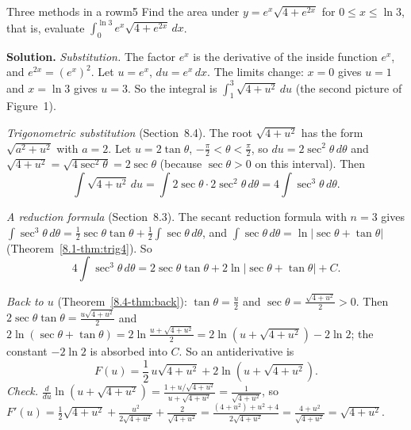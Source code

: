 \documentclass[11pt]{article}
\begin{document}
\begin{exmp}{Three methods in a row}{m5}
Find the area under $y=e^x\sqrt{4+e^{2x}}$ for $0\le x\le\ln3$, that is, evaluate $\displaystyle\int_0^{\ln3}e^x\sqrt{4+e^{2x}}\,dx$.

\textbf{Solution.} \emph{Substitution.} The factor $e^x$ is the derivative of the inside function $e^x$, and $e^{2x}=(e^x)^2$. Let $u=e^x$, $du=e^x\,dx$. The limits change: $x=0$ gives $u=1$ and $x=\ln3$ gives $u=3$. So the integral is $\int_1^3\sqrt{4+u^2}\,du$ (the second picture of Figure~1).

\emph{Trigonometric substitution} (Section~8.4). The root $\sqrt{4+u^2}$ has the form $\sqrt{a^2+u^2}$ with $a=2$. Let $u=2\tan\theta$, $-\frac\pi2<\theta<\frac\pi2$, so $du=2\sec^2\theta\,d\theta$ and $\sqrt{4+u^2}=\sqrt{4\sec^2\theta}=2\sec\theta$ (because $\sec\theta>0$ on this interval). Then
\[\int\sqrt{4+u^2}\,du=\int2\sec\theta\cdot2\sec^2\theta\,d\theta=4\int\sec^3\theta\,d\theta .\]

\emph{A reduction formula} (Section~8.3). The secant reduction formula with $n=3$ gives $\int\sec^3\theta\,d\theta=\frac12\sec\theta\tan\theta+\frac12\int\sec\theta\,d\theta$, and $\int\sec\theta\,d\theta=\ln\lvert\sec\theta+\tan\theta\rvert$ (Theorem~\ref{8.1-thm:trig4}). So
\[4\int\sec^3\theta\,d\theta=2\sec\theta\tan\theta+2\ln\lvert\sec\theta+\tan\theta\rvert+C .\]

\emph{Back to $u$} (Theorem~\ref{8.4-thm:back}): $\tan\theta=\frac u2$ and $\sec\theta=\frac{\sqrt{4+u^2}}2>0$. Then $2\sec\theta\tan\theta=\frac{u\sqrt{4+u^2}}2$ and $2\ln(\sec\theta+\tan\theta)=2\ln\frac{u+\sqrt{4+u^2}}2=2\ln\left(u+\sqrt{4+u^2}\right)-2\ln2$; the constant $-2\ln2$ is absorbed into $C$. So an antiderivative is
\[F(u)=\frac12\,u\sqrt{4+u^2}+2\ln\left(u+\sqrt{4+u^2}\right).\]
\emph{Check.} $\frac{d}{du}\ln\left(u+\sqrt{4+u^2}\right)=\frac{1+u/\sqrt{4+u^2}}{u+\sqrt{4+u^2}}=\frac{1}{\sqrt{4+u^2}}$, so $F'(u)=\frac12\sqrt{4+u^2}+\frac{u^2}{2\sqrt{4+u^2}}+\frac2{\sqrt{4+u^2}}=\frac{(4+u^2)+u^2+4}{2\sqrt{4+u^2}}=\frac{4+u^2}{\sqrt{4+u^2}}=\sqrt{4+u^2}$.


\end{exmp}
\end{document}
